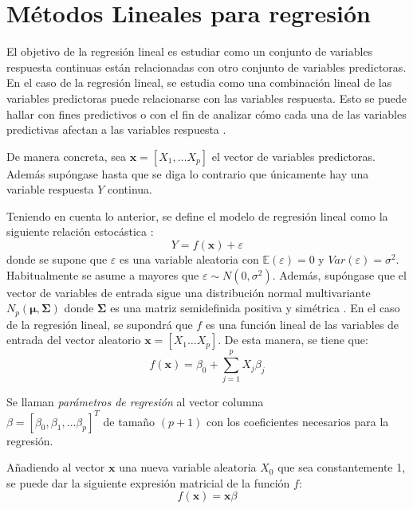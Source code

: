 \section{Métodos Lineales para regresión}

\noindent El objetivo de la regresión lineal es estudiar como un conjunto de variables respuesta continuas están relacionadas con otro conjunto de variables predictoras. En el caso de la regresión lineal, se estudia como una combinación lineal de las variables predictoras puede relacionarse con las variables respuesta. Esto se puede hallar con fines predictivos o con el fin de analizar cómo cada una de las variables predictivas afectan a las variables respuesta \cite{Johnson 2007}. 

\noindent De manera concreta, sea $\mathbf{x}=[X_1,\ldots X_p]$ el vector de variables predictoras. Además supóngase hasta que se diga lo contrario que únicamente hay una variable respuesta $Y$ continua. 

\noindent Teniendo en cuenta lo anterior, se define el modelo de regresión lineal como la siguiente relación estocástica \cite{Hastie 2001, Johnson 2007}:
\begin{equation}
Y=f(\textbf{x})+\varepsilon
\end{equation}
\noindent donde se supone que  $\varepsilon$ es una variable aleatoria con $\mathbb{E}(\varepsilon)=0$ y $Var(\varepsilon)=\sigma^2$. Habitualmente se asume a mayores que  $\varepsilon \sim N(0,\sigma^2)$. Además, supóngase que el vector de variables de entrada sigue una distribución normal multivariante $N_p(\mathbf{\mu},\mathbf{\Sigma})$ donde $\mathbf{\Sigma }$ es una matriz semidefinida positiva y simétrica \cite{Chatfield 1989}. 
\newpage
\noindent En el caso de la regresión lineal, se supondrá que $f$ es una función lineal de las variables de entrada del vector aleatorio $\textbf{x}=[X_1\ldots X_p]$. De esta manera, se tiene que:  
\begin{equation}
f(\textbf{x})=\beta_0+\sum_{j=1}^p X_j\beta_j
\end{equation}

\begin{defi}
Se llaman \emph{parámetros de regresión} al vector columna\\ $\beta=[\beta_0, \beta_1, \ldots \beta_p]^T$ de tamaño $(p+1)$ con los coeficientes necesarios para la regresión. 
\end{defi} 

\noindent Añadiendo al vector $\mathbf{x}$ una nueva variable aleatoria $X_0$ que sea constantemente 1, se puede dar la siguiente expresión matricial de la función $f$:
\begin{equation}
f(\mathbf{x})= \mathbf{x}\beta
\end{equation}

